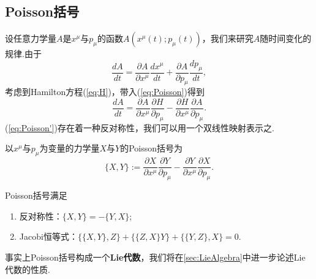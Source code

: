 	\subsection{Poisson括号}
		设任意力学量$A$是$x^\mu$与$p_\mu$的函数$A(x^\mu(t);p_\mu(t))$，我们来研究$A$随时间变化的规律.由于
		\begin{equation}\label{eq:Poisson}
		\frac{dA}{dt}=\frac{\partial A}{\partial x^\mu}\frac{d x^\mu}{dt}+\frac{\partial A}{\partial p_\mu}\frac{dp_\mu}{dt},
		\end{equation}
		考虑到Hamilton方程(\ref{eq:H})，带入(\ref{eq:Poisson})得到
		\begin{equation}\label{eq:Poisson'}
		\frac{dA}{dt}=\frac{\partial A}{\partial x^\mu}\frac{\partial H}{\partial p_\mu}-\frac{\partial H}{\partial x^\mu}\frac{\partial A}{\partial p_\mu}.
		\end{equation}
		(\ref{eq:Poisson'})存在着一种反对称性，我们可以用一个双线性映射表示之.
		\begin{definition}
		以$x^\mu$与$p_\mu$为变量的力学量$X$与$Y$的Poisson括号为
		\begin{equation}\label{eq:PB}
			\{X,Y\}:=\frac{\partial X}{\partial x^\mu}\frac{\partial Y}{\partial p_\mu}-\frac{\partial Y}{\partial x^\mu}\frac{\partial X}{\partial p_\mu}.
		\end{equation}
		\end{definition}
		\begin{remark}
			Poisson括号满足
			\begin{enumerate}
				\item 反对称性：$\{X,Y\}=-\{Y,X\}$;
				\item Jacobi恒等式：$\{\{X,Y\},Z\}+\{\{Z,X\}Y\}+\{\{Y,Z\},X\}=0$.
			\end{enumerate}
			事实上Poisson括号构成一个\textbf{Lie代数}，我们将在\ref{sec:LieAlgebra}中进一步论述Lie代数的性质.
		\end{remark}
		
